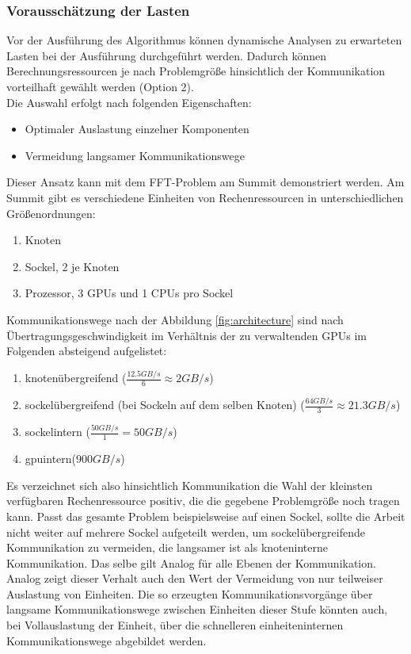 \subsubsection{Vorausschätzung der Lasten}
Vor der Ausführung des Algorithmus können dynamische Analysen zu erwarteten Lasten bei der Ausführung durchgeführt werden. Dadurch können Berechnungsressourcen je nach Problemgröße hinsichtlich der Kommunikation vorteilhaft gewählt werden (Option 2).\\
Die Auswahl erfolgt nach folgenden Eigenschaften:
\begin{itemize}
	\item Optimaler Auslastung einzelner Komponenten
	\item Vermeidung langsamer Kommunikationswege
\end{itemize}
Dieser Ansatz kann mit dem FFT-Problem am Summit demonstriert werden.
Am Summit gibt es verschiedene Einheiten von Rechenressourcen in unterschiedlichen Größenordnungen:
\begin{enumerate}
	\item Knoten
	\item Sockel, 2 je Knoten
	\item Prozessor, 3 GPUs und 1 CPUs pro Sockel
\end{enumerate}
Kommunikationswege nach der Abbildung \ref{fig:architecture} sind nach Übertragungsgeschwindigkeit im Verhältnis der zu verwaltenden GPUs im Folgenden absteigend aufgelistet:
\begin{enumerate}
	\item knotenübergreifend ($\frac{12.5GB/s}{6}\approx 2GB/s$)
	\item sockelübergreifend (bei Sockeln auf dem selben Knoten) ($\frac{64GB/s}{3}\approx 21.3GB/s$)
	\item sockelintern ($\frac{50GB/s}{1}=50GB/s$)
	\item gpuintern($900GB/s$)
\end{enumerate}
Es verzeichnet sich also hinsichtlich Kommunikation die Wahl der kleinsten verfügbaren Rechenressource positiv, die die gegebene Problemgröße noch tragen kann. Passt das gesamte Problem beispielsweise auf einen Sockel, sollte die Arbeit nicht weiter auf mehrere Sockel aufgeteilt werden, um sockelübergreifende Kommunikation zu vermeiden, die langsamer ist als knoteninterne Kommunikation. Das selbe gilt Analog für alle Ebenen der Kommunikation.\\
Analog zeigt dieser Verhalt auch den Wert der Vermeidung von nur teilweiser Auslastung von Einheiten. Die so erzeugten Kommunikationsvorgänge über langsame Kommunikationswege zwischen Einheiten dieser Stufe könnten auch, bei Vollauslastung der Einheit, über die schnelleren einheiteninternen Kommunikationswege abgebildet werden.

